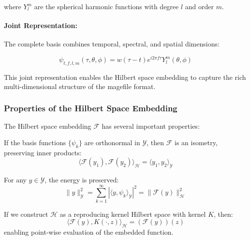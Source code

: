 where $Y_l^m$ are the spherical harmonic functions with degree $l$ and order $m$.

\paragraph{Joint Representation:}
The complete basis combines temporal, spectral, and spatial dimensions:

\begin{equation}
\psi_{t,f,l,m}(\tau, \theta, \phi) = w(\tau-t) e^{i2\pi f \tau} Y_l^m(\theta, \phi)
\end{equation}

This joint representation enables the Hilbert space embedding to capture the rich multi-dimensional structure of the magefile format.

\subsubsection{Properties of the Hilbert Space Embedding}

The Hilbert space embedding $\mathcal{F}$ has several important properties:

\begin{proposition}
If the basis functions $\{\psi_k\}$ are orthonormal in $\mathcal{Y}$, then $\mathcal{F}$ is an isometry, preserving inner products:
\begin{equation}
\langle \mathcal{F}(y_1), \mathcal{F}(y_2) \rangle_{\mathcal{H}} = \langle y_1, y_2 \rangle_{\mathcal{Y}}
\end{equation}
\end{proposition}

\begin{proposition}
For any $y \in \mathcal{Y}$, the energy is preserved:
\begin{equation}
\|y\|_{\mathcal{Y}}^2 = \sum_{k=1}^{\infty} |\langle y, \psi_k \rangle_{\mathcal{Y}}|^2 = \|\mathcal{F}(y)\|_{\mathcal{H}}^2
\end{equation}
\end{proposition}

\begin{proposition}
If we construct $\mathcal{H}$ as a reproducing kernel Hilbert space with kernel $K$, then:
\begin{equation}
\langle \mathcal{F}(y), K(\cdot, z) \rangle_{\mathcal{H}} = (\mathcal{F}(y))(z)
\end{equation}
enabling point-wise evaluation of the embedded function.
\end{proposition}

